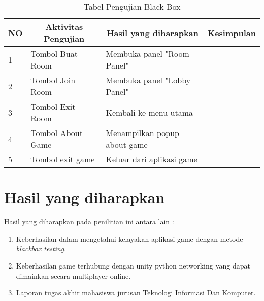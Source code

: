     \begin{table}[h]
    \centering
    \begin{tabular}{|l|l|l|l|}
    \hline
    \multicolumn{1}{|c|}{NO} & \multicolumn{1}{c|}{Aktivitas Pengujian} & \multicolumn{1}{c|}{Hasil yang diharapkan} & \multicolumn{1}{c|}{Kesimpulan} \\ \hline
    1                        & Tombol Buat Room                         & Membuka panel "Room Panel"                 &                                 \\ \hline
    2                        & Tombol Join Room                         & Membuka panel "Lobby Panel"                &                                 \\ \hline
    3                        & Tombol Exit Room                         & Kembali ke menu utama                      &                                 \\ \hline
    4                        & Tombol About Game                        & Menampilkan popup about game               &                                 \\ \hline
    5                        & Tombol exit game                         & Keluar dari aplikasi game                  &                                 \\ \hline
    \end{tabular}
    \caption{Tabel Pengujian Black Box}
    \label{lab:tabel-pengujian}
    \end{table}
\newpage        
\section{Hasil yang diharapkan}
Hasil yang diharapkan pada penilitian ini antara lain :
\begin{enumerate}
    \item Keberhasilan dalam mengetahui kelayakan aplikasi game dengan metode \textit{blackbox testing}.
    \item Keberhasilan game terhubung dengan unity python networking yang dapat dimainkan secara multiplayer online.
    \item Laporan tugas akhir mahasiswa jurusan Teknologi Informasi Dan Komputer.
\end{enumerate}